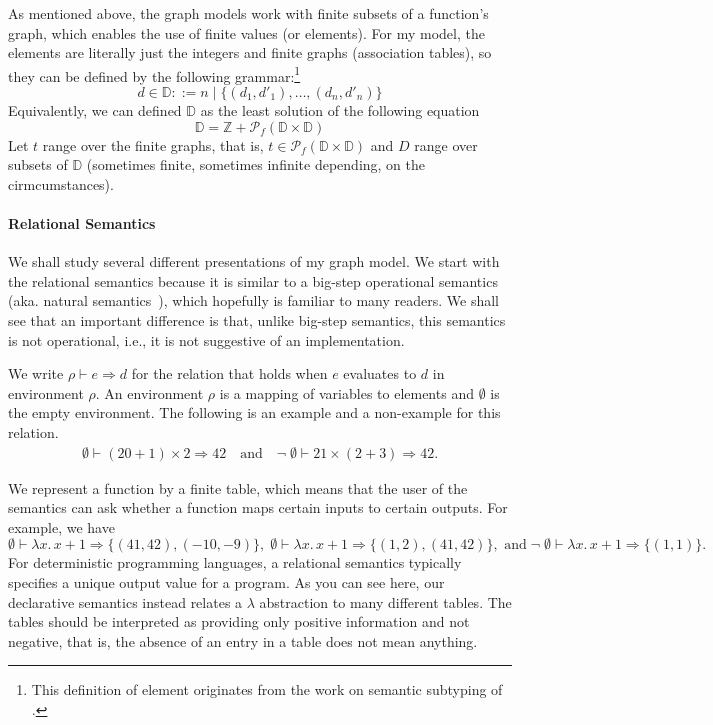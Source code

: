 \documentclass{tufte-handout}
\newcommand{\LAM}[1]{\lambda #1.\,}
\begin{document}
As mentioned above, the graph models work with finite subsets of a
function's graph, which enables the use of finite values (or
elements). For my model, the elements are literally just the integers
and finite graphs (association tables), so they can be defined by the
following grammar:\footnote{This definition of element originates from
  the work on semantic subtyping of \citet{Frisch:2008aa}.}
\[
   d \in \mathbb{D} ::= n \mid \{ (d_1,d'_1), \ldots, (d_n,d'_n) \}
\]
Equivalently, we can defined $\mathbb{D}$ as the least solution of the
following equation
\[
   \mathbb{D} = \mathbb{Z} + \mathcal{P}_f(\mathbb{D} \times \mathbb{D})
\]
Let $t$ range over the finite graphs, that is, $t \in
\mathcal{P}_f(\mathbb{D} \times \mathbb{D})$ and $D$ range over
subsets of $\mathbb{D}$ (sometimes finite, sometimes infinite
depending, on the cirmcumstances).


\paragraph{Relational Semantics}

We shall study several different presentations of my graph model.  We
start with the relational semantics because it is similar to a
big-step operational semantics (aka. natural
semantics~\citep{Kahn:1987aa}), which hopefully is familiar to many
readers. We shall see that an important difference is that, unlike
big-step semantics, this semantics is not operational, i.e., it is not
suggestive of an implementation.

We write $\rho \vdash e \Rightarrow d$ for the relation that holds
when $e$ evaluates to $d$ in environment $\rho$. An environment $\rho$
is a mapping of variables to elements and $\emptyset$ is the empty
environment. The following is an example and a non-example for this
relation.
\begin{align*}
   \emptyset \vdash (20 + 1) \times 2 \Rightarrow 42 \quad\text{and}\quad
   \neg\; \emptyset \vdash 21 \times (2 + 3) \Rightarrow 42.
\end{align*}

We represent a function by a finite table, which means that the user
of the semantics can ask whether a function maps certain inputs to
certain outputs. For example, we have
\[
  \emptyset\vdash \LAM{x} x+1 \Rightarrow 
    \{ (41,42), (-10,-9) \},
  \;
  \emptyset\vdash \LAM{x} x+1 \Rightarrow  
    \{ (1,2), (41,42) \}, \text{ and}
  \;
  \neg\; \emptyset\vdash \LAM{x} x+1 \Rightarrow \{ (1,1) \}.
\]
For deterministic programming languages, a relational semantics
typically specifies a unique output value for a program. As you can
see here, our declarative semantics instead relates a $\lambda$
abstraction to many different tables. The tables should be interpreted
as providing only positive information and not negative, that is, the
absence of an entry in a table does not mean anything.
\end{document}
